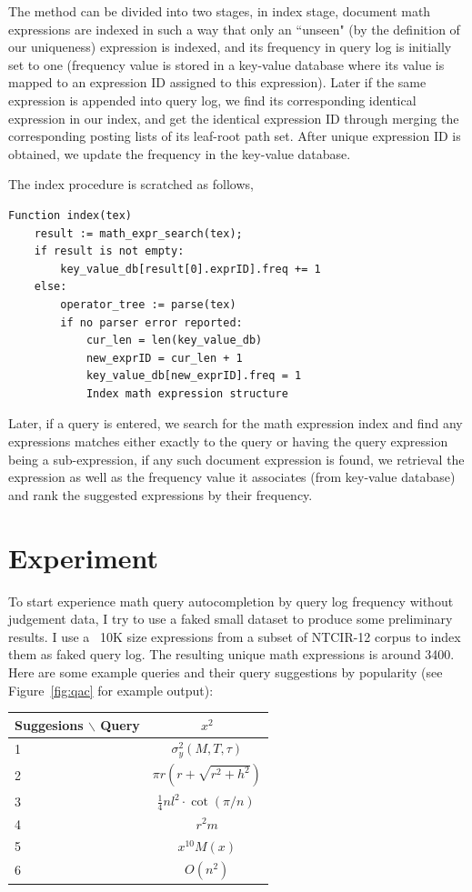 \documentclass[a4paper]{article}
\begin{document}
The method can be divided into two stages, in index stage, document math expressions are indexed in such a way that only an ``unseen" (by the definition of our uniqueness) expression is indexed, and its frequency in query log is initially set to one (frequency value is stored in a key-value database where its value is mapped to an expression ID assigned to this expression). Later if the same expression is appended into query log, we find its corresponding identical expression in our index, and get the identical expression ID through merging the corresponding posting lists of its leaf-root path set. After unique expression ID is obtained, we update the frequency in the key-value database.

The index procedure is scratched as follows,
\begin{verbatim}
Function index(tex)
    result := math_expr_search(tex);
    if result is not empty:
        key_value_db[result[0].exprID].freq += 1
    else:
        operator_tree := parse(tex)
        if no parser error reported:
            cur_len = len(key_value_db)
            new_exprID = cur_len + 1
            key_value_db[new_exprID].freq = 1
            Index math expression structure
\end{verbatim}

Later, if a query is entered, we search for the math expression index and find any expressions matches either exactly to the query or having the query expression being a sub-expression, if any such document expression is found, we retrieval the expression as well as the frequency value it associates (from key-value database) and rank the suggested expressions by their frequency.

\section{Experiment}
To start experience math query autocompletion by query log frequency without judgement data, I try to use a faked small dataset to produce some preliminary results. I use a ~10K size expressions from a subset of NTCIR-12 corpus to index them as faked query log. The resulting unique math expressions is around 3400. Here are some example queries and their query suggestions by popularity (see Figure~\ref{fig:qac} for example output):

\begin{center}
\begin{tabular}{lc}
Suggesions $\backslash$ Query  & $x^2$ \\
\hline
 1 & $\sigma_{y}^{2}(M,T,\tau)$ \\
 2 &  $\pi r\left(r+\sqrt{r^{2}+h^{2}}\right)$ \\
 3 & $\frac{1}{4}nl^{2}\cdot\cot(\pi/n)\,\! $ \\
 4 & $r^{2}m$ \\
 5 & $x^{10}M(x)$ \\
 6 & $O(n^{2})$ \\
\end{tabular}
\end{center}
\end{document}
